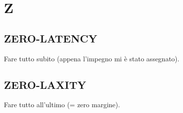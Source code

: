 \newpage
	\flushright{\hyperref[index]{\color{black!65}{Ritorna all'indice}}}\flushleft
	\section{Z} \label{sec:Z}
	
		\subsection{ZERO-LATENCY}  \label{zero-latency}
		Fare tutto subito (appena l'impegno mi è stato assegnato).
		
		\subsection{ZERO-LAXITY}  \label{zero-laxity}
		Fare tutto all'ultimo (= zero margine).


